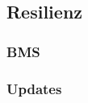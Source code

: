 \subsection{Resilienz}
\label{subsec:resilienz}

\subsubsection{BMS}
\label{subsubsec:bms-monitor}

\subsubsection{Updates}
